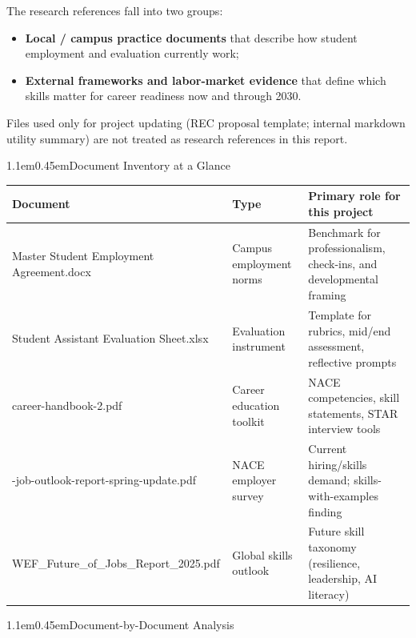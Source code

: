 \documentclass[11pt,letterpaper]{article}
\makeatletter
\renewcommand\section{\@startsection{section}{1}{\z@}%
  {1.1em}{0.45em}{\large\bfseries}}
\makeatother
\begin{document}
The research references fall into two groups:
\begin{itemize}
  \item \textbf{Local / campus practice documents} that describe how student employment and evaluation currently work;
  \item \textbf{External frameworks and labor-market evidence} that define which skills matter for career readiness now and through 2030.
\end{itemize}
Files used only for project updating (REC proposal template; internal markdown utility summary) are not treated as research references in this report.

\section{Document Inventory at a Glance}

\begin{center}
\renewcommand{\arraystretch}{1.15}
\begin{tabularx}{\textwidth}{>{\raggedright\arraybackslash}p{} >{\raggedright\arraybackslash}p{} >{\raggedright\arraybackslash}X}
\toprule
\textbf{Document} & \textbf{Type} & \textbf{Primary role for this project} \\
\midrule
Master Student Employment Agreement.docx & Campus employment norms & Benchmark for professionalism, check-ins, and developmental framing \\
\midrule
Student Assistant Evaluation Sheet.xlsx & Evaluation instrument & Template for rubrics, mid/end assessment, reflective prompts \\
\midrule
career-handbook-2.pdf & Career education toolkit & NACE competencies, skill statements, STAR interview tools \\
\midrule
2026-job-outlook-report-spring-update.pdf & NACE employer survey & Current hiring/skills demand; skills-with-examples finding \\
\midrule
WEF\_Future\_of\_Jobs\_Report\_2025.pdf & Global skills outlook & Future skill taxonomy (resilience, leadership, AI literacy) \\
\bottomrule
\end{tabularx}
\end{center}

\section{Document-by-Document Analysis}
\end{document}
